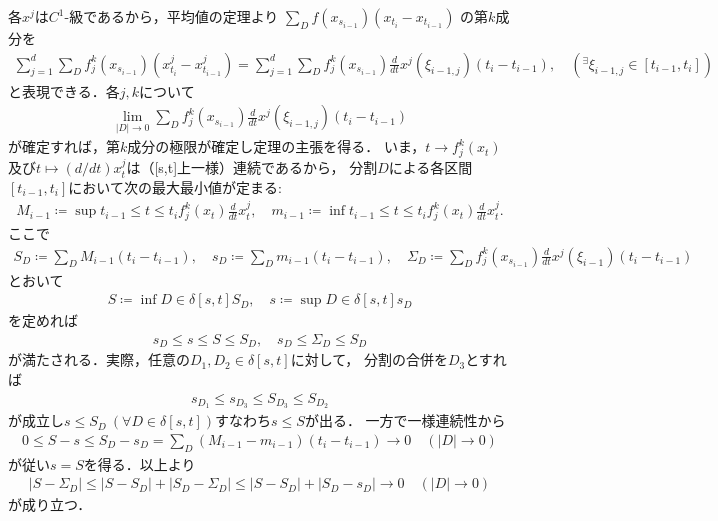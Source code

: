 	\begin{prf}
		各$x^j$は$C^1$-級であるから，平均値の定理より
		$\sum_{D} f(x_{s_{i-1}})(x_{t_i} - x_{t_{i-1}})$
		の第$k$成分を
		\begin{align}
			\sum_{j=1}^{d} \sum_{D} f^k_j (x_{s_{i-1}})(x^j_{t_i} - x^j_{t_{i-1}})
			= \sum_{j=1}^{d} \sum_{D} f^k_j (x_{s_{i-1}}) \frac{d}{dt}x^j(\xi_{i-1,j})(t_i - t_{i-1}),
			\quad ({}^\exists \xi_{i-1,j} \in [t_{i-1},t_i])
		\end{align}
		と表現できる．各$j,k$について
		\begin{align}
			\lim_{|D| \to 0} \sum_{D} f^k_j (x_{s_{i-1}}) \frac{d}{dt}x^j(\xi_{i-1,j})(t_i - t_{i-1})
		\end{align}
		が確定すれば，第$k$成分の極限が確定し定理の主張を得る．
		いま，$t \longrightarrow f^k_j(x_t)$及び$t \longmapsto (d/dt)x^j_t$は（[s,t]上一様）連続であるから，
		分割$D$による各区間$[t_{i-1},t_i]$において次の最大最小値が定まる:
		\begin{align}
			M_{i-1} \coloneqq \sup{t_{i-1} \leq t \leq t_i} f^k_j(x_t)\frac{d}{dt}x^j_t,
			\quad m_{i-1} \coloneqq \inf{t_{i-1} \leq t \leq t_i} f^k_j(x_t)\frac{d}{dt}x^j_t.
		\end{align}
		ここで
		\begin{align}
			S_D \coloneqq \sum_{D} M_{i-1}(t_i - t_{i-1}),
			\quad s_D \coloneqq \sum_{D} m_{i-1}(t_i - t_{i-1}),
			\quad \Sigma_D \coloneqq \sum_{D} f^k_j (x_{s_{i-1}}) \frac{d}{dt}x^j(\xi_{i-1})(t_i - t_{i-1})
		\end{align}
		とおいて
		\begin{align}
			S \coloneqq \inf{D \in \delta[s,t]}{S_D},
			\quad s \coloneqq \sup{D \in \delta[s,t]}{s_D}
		\end{align}
		を定めれば
		\begin{align}
			s_D \leq s \leq S \leq S_D,
			\quad s_D \leq \Sigma_D \leq S_D
		\end{align}
		が満たされる．実際，任意の$D_1,D_2 \in \delta[s,t]$に対して，
		分割の合併を$D_3$とすれば
		\begin{align}
			s_{D_1} \leq s_{D_3} \leq S_{D_3} \leq S_{D_2}
		\end{align}
		が成立し$s \leq S_D\ (\forall D \in \delta[s,t])$すなわち$s \leq S$が出る．
		一方で一様連続性から
		\begin{align}
			0 \leq S - s \leq S_D - s_D = \sum_D (M_{i-1} - m_{i-1})(t_i - t_{i-1})
			\longrightarrow 0
			\quad (|D| \longrightarrow 0)
		\end{align}
		が従い$s = S$を得る．以上より
		\begin{align}
			|S - \Sigma_D| \leq |S - S_D| + |S_D - \Sigma_D|
			\leq |S - S_D| + |S_D - s_D|
			\longrightarrow 0
			\quad (|D| \longrightarrow 0)
		\end{align}
		が成り立つ．
		\QED
\end{prf}

